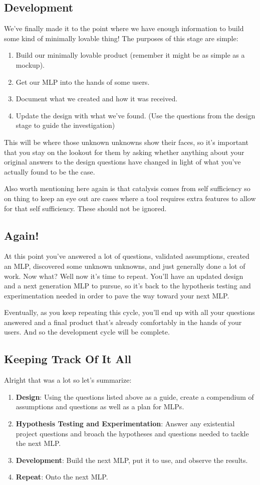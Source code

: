 \documentclass[10pt,a5paper]{book}
\begin{document}
\subsection{Development}
We've finally made it to the point where we have enough information to build some kind of minimally lovable thing! The purposes of this stage are simple:
\begin{enumerate}
\item Build our minimally lovable product (remember it might be as simple as a mockup).
\item Get our MLP into the hands of some users.
\item Document what we created and how it was received.
\item Update the design with what we've found. (Use the questions from the design stage to guide the investigation)
\end{enumerate}

This will be where those unknown unknowns show their faces, so it's important that you stay on the lookout for them by asking whether anything about your original answers to the design questions have changed in light of what you've actually found to be the case. 

Also worth mentioning here again is that catalysis comes from self sufficiency so on thing to keep an eye out are cases where a tool requires extra features to allow for that self sufficiency. These should not be ignored.

\subsection{Again!}
At this point you've answered a lot of questions, validated assumptions, created an MLP, discovered some unknown unknowns, and just generally done a lot of work. Now what? Well now it's time to repeat. You'll have an updated design and a next generation MLP to pursue, so it's back to the hypothesis testing and experimentation needed in order to pave the way toward your next MLP.

Eventually, as you keep repeating this cycle, you'll end up with all your questions answered and a final product that's already comfortably in the hands of your users. And so the development cycle will be complete. 

\subsection{Keeping Track Of It All}
Alright that was a lot so let's summarize:
\begin{enumerate}
\item \textbf{Design}: Using the questions listed above as a guide, create a compendium of assumptions and questions as well as a plan for MLPs.
\item \textbf{Hypothesis Testing and Experimentation}: Answer any existential project questions and broach the hypotheses and questions needed to tackle the next MLP.
\item \textbf{Development}: Build the next MLP, put it to use, and observe the results.
\item \textbf{Repeat}: Onto the next MLP.
\end{enumerate}
\end{document}
